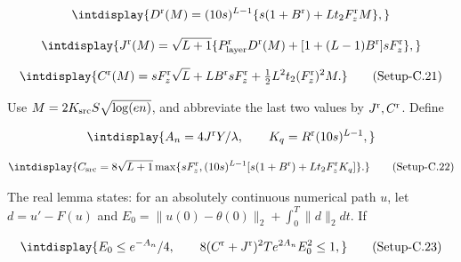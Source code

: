 \begingroup\renewcommand{\theHequation}{intdisplay.947}
\begin{equation*}
\intdisplay{
D^{\rm r}(M)=(10s)^{L-1}\{s(1+B^{\rm r})+Lt_2F_z^{\rm r}M\},
}
\end{equation*}
\endgroup

\begingroup\renewcommand{\theHequation}{intdisplay.948}
\begin{equation*}
\intdisplay{
J^{\rm r}(M)=\sqrt{L+1}\{P^{\rm r}_{\rm layer}D^{\rm r}(M)
 +[1+(L-1)B^{\rm r}]sF_z^{\rm r}\},
}
\end{equation*}
\endgroup

\label{int:eq-setup-c-21}
\begingroup\renewcommand{\theHequation}{intdisplay.949}
\begin{equation}
\intdisplay{
C^{\rm r}(M)=sF_z^{\rm r}\sqrt L+LB^{\rm r}sF_z^{\rm r}
 +\tfrac12L^2t_2(F_z^{\rm r})^2M.
}
\tag{Setup-C.21}
\label{int:eq-0477-setup-c-21}
\end{equation}
\endgroup


Use \(M=2K_{\rm src}S\sqrt{\log(en)}\), and abbreviate the last two values by \(J^{\rm r},\allowbreak C^{\rm r}\). Define


\begingroup\renewcommand{\theHequation}{intdisplay.950}
\begin{equation*}
\intdisplay{
A_n=4J^{\rm r}Y/\lambda,\qquad K_q=R^{\rm r}(10s)^{L-1},
}
\end{equation*}
\endgroup

\label{int:eq-setup-c-22}
\begingroup\renewcommand{\theHequation}{intdisplay.951}
\begin{equation}
\intdisplay{
C_{\rm src}=8\sqrt{L+1}\max\{sF_z^{\rm r},
(10s)^{L-1}[s(1+B^{\rm r})+Lt_2F_z^{\rm r}K_q]\}.
}
\tag{Setup-C.22}
\label{int:eq-0478-setup-c-22}
\end{equation}
\endgroup


The real lemma states: for an absolutely continuous numerical path \(u\), let \(d=u'-F(u)\) and \(E_0=\|u(0)-\theta(0)\|_2+\int_0^T\|d\|_2dt\). If


\label{int:eq-setup-c-23}
\begingroup\renewcommand{\theHequation}{intdisplay.952}
\begin{equation}
\intdisplay{
E_0\le e^{-A_n}/4,\qquad
8(C^{\rm r}+J^{\rm r})^2T e^{2A_n}E_0^2\le1,
}
\tag{Setup-C.23}
\label{int:eq-0479-setup-c-23}
\end{equation}
\endgroup

